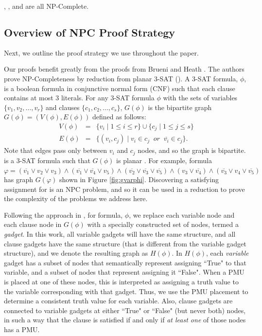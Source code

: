 \begin{theorem}
\maxincs, \xvalparts, \full and \xval are all NP-Complete.
\label{thm:pmu-npc}
\end{theorem}



\subsection{Overview of NPC Proof Strategy}
\label{subsec:proofstrat}
Next, we outline the proof strategy we use throughout the paper. 

Our proofs benefit greatly from the proofs from Brueni and Heath \cite{Brueni05}. The authors prove NP-Completeness by reduction from planar 3-SAT (\sats).
A 3-SAT formula, $\phi$, is a boolean formula in conjunctive normal form (CNF) such 
that each clause contains at most $3$ literals. For any 3-SAT formula $\phi$ with the sets of variables $\{v_1,v_2, \dots , v_r\}$ and clauses $\{c_1,c_2, \dots , c_s \}$, $G(\phi)$ 
is the bipartite graph $G(\phi)=(V(\phi),E(\phi))$ defined as follows:
\begin{eqnarray*}
 V(\phi) &= &\{v_i\; \vert\; 1 \leq i \leq r \} \cup \{c_j \;\vert\; 1 \leq j \leq s \} \\
 E(\phi) &=& \{ (v_i,c_j)\;\vert\; v_i \in c_j\;\; or \;\; \overline{v_i} \in c_j\}.
\end{eqnarray*}
Note that edges pass only between $v_i$ and $c_j$ nodes, and so the graph is bipartite.  \sat is a 3-SAT formula such that $G(\phi)$ is planar \cite{Lich82}. 
For example, \sat formula
	 $\varphi = (\overline{v_1} \vee v_2 \vee v_3) \wedge (\overline{v_1} \vee \overline{v_4} \vee v_5) \wedge (\overline{v_2} \vee \overline{v_3} \vee \overline{v_5}) 
	 \wedge (v_3 \vee \overline{v_4}) \wedge  (\overline{v_3} \vee v_4 \vee \overline{v_5})$
has graph $G(\varphi)$ shown in Figure \ref{fig:gvarphi}. 
Discovering a satisfying assignment for  \sat is an NPC problem, and so it can be used in a reduction to prove the complexity of the problems we address here. 

Following the approach in \cite{Brueni05}, for \sat formula, $\phi$, we replace each variable node and each clause node in $G(\phi)$ with a specially constructed set of nodes,
termed a {\em gadget}. In this work, all variable gadgets will have the same structure, and all clause gadgets have the same structure (that is different from the variable gadget structure), 
and we denote the resulting graph as $H(\phi)$. In $H(\phi)$, each {\em variable} gadget has a subset of nodes that semantically represent assigning ``True" to that variable, and a subset of 
nodes that represent assigning it ``False". When a PMU is placed at one of these nodes, this is interpreted as assigning a truth value to the \sat variable corresponding with that gadget. 
Thus, we use the PMU placement to determine a consistent truth value for each \sat variable. Also, clause gadgets are connected to variable gadgets at either ``True" or ``False" (but never both) 
nodes, in such a way that the clause is satisfied if and only if {\em at least one} of those nodes has a PMU.

